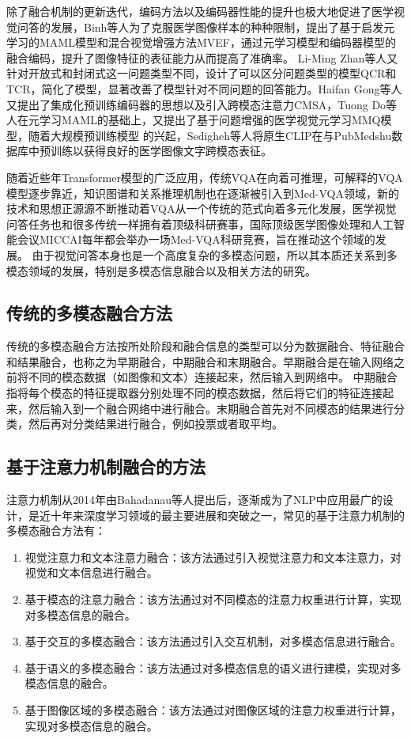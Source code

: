 除了融合机制的更新迭代，编码方法以及编码器性能的提升也极大地促进了医学视觉问答的发展，Binh等人为了克服医学图像样本的种种限制\cite{nguyen2019overcoming}，提出了基于启发元学习的MAML模型和混合视觉增强方法MVEF，通过元学习模型和编码器模型的融合编码，提升了图像特征的表征能力从而提高了准确率。
Li-Ming Zhan等人\cite{zhan2020medical}又针对开放式和封闭式这一问题类型不同，设计了可以区分问题类型的模型QCR和TCR，简化了模型，显著改善了模型针对不同问题的回答能力。Haifan Gong等人\cite{gong2021cross}又提出了集成化预训练编码器的思想以及引入跨模态注意力CMSA，Tuong Do等人\cite{do2021multiple}在元学习MAML的基础上，又提出了基于问题增强的医学视觉元学习MMQ模型，随着大规模预训练模型
的兴起，Sedigheh等人\cite{eslami2021does}将原生CLIP在与PubMedshu数据库中预训练以获得良好的医学图像文字跨模态表征。

随着近些年Transformer模型的广泛应用，传统VQA在向着可推理，可解释的VQA模型逐步靠近，知识图谱和关系推理机制也在逐渐被引入到Med-VQA领域\cite{chen2022align}，新的技术和思想正源源不断推动着VQA从一个传统的范式向着多元化发展\cite{lin2021medical}，医学视觉问答任务也和很多传统一样拥有着顶级科研赛事，国际顶级医学图像处理和人工智能会议MICCAI每年都会举办一场Med-VQA科研竞赛，旨在推动这个领域的发展。
由于视觉问答本身也是一个高度复杂的多模态问题，所以其本质还关系到多模态领域的发展，特别是多模态信息融合以及相关方法的研究。
\subsection{传统的多模态融合方法}
传统的多模态融合方法按所处阶段和融合信息的类型可以分为数据融合、特征融合和结果融合，也称之为早期融合，中期融合和末期融合。早期融合是在输入网络之前将不同的模态数据（如图像和文本）连接起来，然后输入到网络中。
中期融合指将每个模态的特征提取器分别处理不同的模态数据，然后将它们的特征连接起来，然后输入到一个融合网络中进行融合。末期融合首先对不同模态的结果进行分类，然后再对分类结果进行融合，例如投票或者取平均。
\subsection{基于注意力机制融合的方法}
注意力机制从2014年由Bahadanau等人\cite{bahdanau2014neural}提出后，逐渐成为了NLP中应用最广的设计，是近十年来深度学习领域的最主要进展和突破之一，常见的基于注意力机制的多模态融合方法有：
\begin{enumerate}[topsep = 0 pt, itemsep= 0 pt, parsep=0pt, partopsep=0pt, leftmargin=44pt, itemindent=0pt, labelsep=6pt, label=(\arabic*)]
    \item 视觉注意力和文本注意力融合：该方法通过引入视觉注意力和文本注意力，对视觉和文本信息进行融合。
    \item 基于模态的注意力融合：该方法通过对不同模态的注意力权重进行计算，实现对多模态信息的融合。
    \item 基于交互的多模态融合：该方法通过引入交互机制，对多模态信息进行融合。
    \item 基于语义的多模态融合：该方法通过对多模态信息的语义进行建模，实现对多模态信息的融合。
    \item 基于图像区域的多模态融合：该方法通过对图像区域的注意力权重进行计算，实现对多模态信息的融合。
\end{enumerate}
